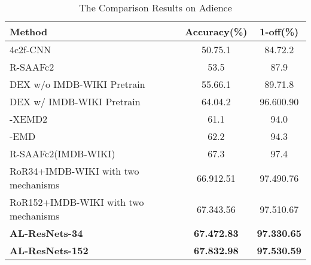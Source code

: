 \documentclass[journal]{IEEEtran}
\begin{document}
\begin{table}[!t]
\renewcommand{\arraystretch}{1.3}
\caption{The Comparison Results on Adience }
\label{tab:comparison results}
\centering
\begin{tabular}{|p{3.1cm}|c|c|}
\hline
Method                         &Accuracy(\%)      &1-off(\%)   \\ \hline\hline
4c2f-CNN~\cite{ref-16}                     &50.75.1         &84.72.2    \\\hline
R-SAAFc2~\cite{ref-17}                    &53.5                   &87.9       \\\hline
DEX w/o IMDB-WIKI
Pretrain~\cite{ref-19}                     &55.66.1          &89.71.8      \\\hline
DEX w/ IMDB-WIKI
Pretrain~\cite{ref-19}                    &64.04.2          &96.600.90     \\\hline
-XEMD2~\cite{ref-18}                    &61.1                &94.0          \\\hline
-EMD~\cite{ref-18}                     &62.2                &94.3           \\\hline
R-SAAFc2(IMDB-WIKI)~\cite{ref-21}          &67.3                 &97.4              \\\hline
RoR34+IMDB-WIKI
with two mechanisms~\cite{ref-22}                     &66.912.51       &97.490.76           \\\hline
RoR152+IMDB-WIKI
with two mechanisms~\cite{ref-22}                      &67.343.56       &97.510.67           \\\hline
\textbf{AL-ResNets-34}           &\textbf{67.472.83}       &\textbf{97.330.65}             \\\hline
\textbf{AL-ResNets-152}           &\textbf{67.832.98}       &\textbf{97.530.59}             \\\hline
\end{tabular}
\end{table}
\end{document}
